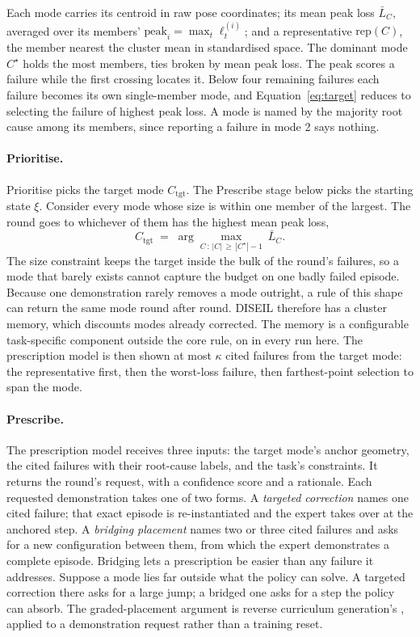 Each mode carries its centroid in raw pose coordinates; its mean peak loss
$\bar{L}_C$, averaged over its members' $\mathrm{peak}_i = \max_t \ell^{(i)}_t$;
and a representative $\mathrm{rep}(C)$, the member nearest the cluster mean in
standardised space. The dominant mode $C^\star$ holds the most members, ties
broken by mean peak loss. The peak scores a failure while the first crossing
locates it. Below four remaining failures each failure becomes its own
single-member mode, and Equation~\ref{eq:target} reduces to selecting the failure
of highest peak loss. A
mode is named by the majority root cause among its members, since reporting a
failure in mode 2 says nothing.

\paragraph{Prioritise.} Prioritise picks the target mode $C_{\mathrm{tgt}}$. The
Prescribe stage below picks the starting state $\xi$. Consider every mode whose
size is within one member of the largest.
The round goes to whichever of them has the highest mean peak loss,
%
\begin{equation}
\label{eq:target}
C_{\mathrm{tgt}} \;=\; \arg\max_{C \,:\, |C| \,\ge\, |C^\star| - 1} \
\bar{L}_C .
\end{equation}
%
The size constraint keeps the target inside the bulk of the round's failures, so a
mode that barely exists cannot capture the budget on one badly failed episode.
Because one demonstration rarely removes a mode outright, a rule of this shape can
return the same mode round after round. DISEIL therefore has a cluster memory,
which discounts modes already corrected. The memory is a configurable
task-specific component outside the core rule, on in every run here. The
prescription model is then shown at most $\kappa$ cited failures from the target
mode: the representative first, then the worst-loss failure, then farthest-point
selection \cite{eldar1997fps} to span the mode.

\paragraph{Prescribe.} The prescription model receives three inputs: the target
mode's anchor geometry, the cited failures with their root-cause labels, and the
task's constraints. It returns the round's request, with a confidence score and a
rationale. Each requested demonstration takes one of two forms. A \emph{targeted
correction} names one cited failure; that exact episode is re-instantiated and the
expert takes over at the anchored step. A \emph{bridging placement} names two or
three cited failures and asks for a new configuration between them, from which the
expert demonstrates a complete episode. Bridging lets a prescription be easier than
any failure it addresses. Suppose a mode lies far outside what the policy can
solve. A targeted correction there asks for a large jump; a bridged one asks for a
step the policy can absorb. The graded-placement argument
is reverse curriculum generation's \cite{florensa2017reversecurriculum}, applied to
a demonstration request rather than a training reset.

